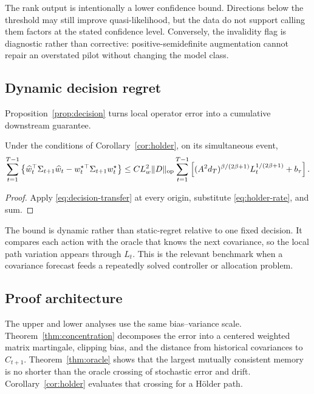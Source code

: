 The rank output is intentionally a lower confidence bound.  Directions below the threshold may still improve quasi-likelihood, but the data do not support calling them factors at the stated confidence level.  Conversely, the invalidity flag is diagnostic rather than corrective: positive-semidefinite augmentation cannot repair an overstated pilot without changing the model class.

\subsection{Dynamic decision regret}

Proposition~\ref{prop:decision} turns local operator error into a cumulative downstream guarantee.

\begin{corollary}
\label{cor:dynamic-regret}
Under the conditions of Corollary~\ref{cor:holder}, on its simultaneous event,
\begin{equation}
 \sum_{t=1}^{T-1}\left\{
 \widehat w_t^\top\Sigma_{t+1}\widehat w_t
 -w_t^{\star\top}\Sigma_{t+1}w_t^\star\right\}
 \le C L_w^2\|D\|_{\mathrm{op}}
 \sum_{t=1}^{T-1}\left[
 (A^2d_T)^{\beta/(2\beta+1)}L_t^{1/(2\beta+1)}+b_\tau
 \right].
 \label{eq:dynamic-regret}
\end{equation}
\end{corollary}

\begin{proof}
Apply \eqref{eq:decision-transfer} at every origin, substitute \eqref{eq:holder-rate}, and sum.
\end{proof}

The bound is dynamic rather than static-regret relative to one fixed decision.  It compares each action with the oracle that knows the next covariance, so the local path variation appears through $L_t$.  This is the relevant benchmark when a covariance forecast feeds a repeatedly solved controller or allocation problem.

\subsection{Proof architecture}

The upper and lower analyses use the same bias--variance scale.  Theorem~\ref{thm:concentration} decomposes the error into a centered weighted matrix martingale, clipping bias, and the distance from historical covariances to $C_{t+1}$.  Theorem~\ref{thm:oracle} shows that the largest mutually consistent memory is no shorter than the oracle crossing of stochastic error and drift.  Corollary~\ref{cor:holder} evaluates that crossing for a H\"older path.

